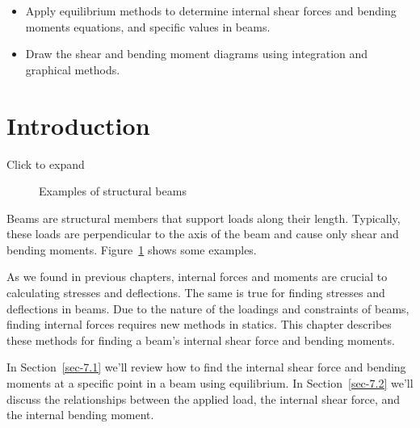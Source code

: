 \documentclass[
  letterpaper,
  DIV=11,
  numbers=noendperiod]{scrreprt}
\providecommand{\tightlist}{%
  \setlength{\itemsep}{0pt}\setlength{\parskip}{0pt}}\usepackage{longtable,booktabs,array}
\theoremstyle{definition}
\theoremstyle{remark}
\begin{document}
\begin{tcolorbox}[enhanced jigsaw, leftrule=.75mm, bottomrule=.15mm, opacityback=0, opacitybacktitle=0.6, colframe=quarto-callout-note-color-frame, toprule=.15mm, colbacktitle=quarto-callout-note-color!10!white, coltitle=black, bottomtitle=1mm, title={Learning Objectives}, titlerule=0mm, toptitle=1mm, colback=white, rightrule=.15mm, left=2mm, arc=.35mm, breakable]

\begin{itemize}
\tightlist
\item
  Apply equilibrium methods to determine internal shear forces and
  bending moments equations, and specific values in beams.
\item
  Draw the shear and bending moment diagrams using integration and
  graphical methods.
\end{itemize}

\end{tcolorbox}

\section*{Introduction}\label{introduction-6}


Click to expand

\begin{figure}


\caption{\label{fig-7.1}Examples of structural beams}

\end{figure}%

Beams are structural members that support loads along their length.
Typically, these loads are perpendicular to the axis of the beam and
cause only shear and bending moments. Figure~\ref{fig-7.1} shows some
examples.

As we found in previous chapters, internal forces and moments are
crucial to calculating stresses and deflections. The same is true for
finding stresses and deflections in beams. Due to the nature of the
loadings and constraints of beams, finding internal forces requires new
methods in statics. This chapter describes these methods for finding a
beam's internal shear force and bending moments.

In Section~\ref{sec-7.1} we'll review how to find the internal shear
force and bending moments at a specific point in a beam using
equilibrium. In Section~\ref{sec-7.2} we'll discuss the relationships
between the applied load, the internal shear force, and the internal
bending moment.
\end{document}

